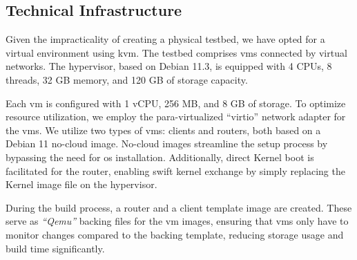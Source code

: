 \subsection{Technical Infrastructure} %
\label{sub:Technical Infrastructure}
Given the impracticality of creating a physical testbed, we have opted for a 
    virtual environment using \gls{kvm}.
The testbed comprises \glspl{vm} connected by virtual networks.
The hypervisor, based on Debian 11.3, is equipped with 4 CPUs, 8 threads, 32 GB
    memory, and 120 GB of storage capacity.

Each \gls{vm} is configured with 1 vCPU, 256 MB, and 8 GB of storage.
To optimize resource utilization, we employ the para-virtualized ``virtio''
    network adapter for the \glspl{vm}.
We utilize two types of \glspl{vm}: clients and routers, both based on a Debian
    11 no-cloud image.
No-cloud images streamline the setup process by bypassing the need for \gls{os}
    installation.
Additionally, direct Kernel boot is facilitated for the router, enabling swift
    kernel exchange by simply replacing the Kernel image file on the
    hypervisor.

During the build process, a router and a client template image are created.
These serve as \textit{``Qemu''} backing files for the \gls{vm} images,
    ensuring that \glspl{vm} only have to monitor changes compared to the
    backing template, reducing storage usage and build time significantly.

